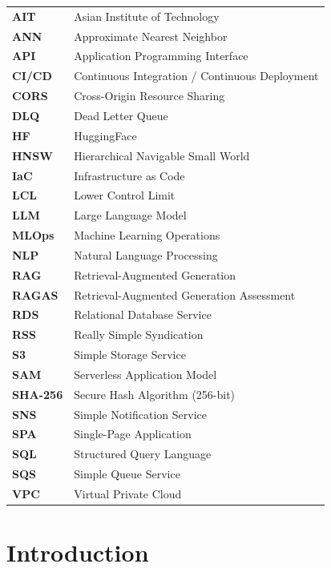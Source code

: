 \documentclass[12pt,a4paper]{report}
\begin{document}
\begin{tabular}{@{}p{3.2cm}p{10.0cm}@{}}
\textbf{AIT} & Asian Institute of Technology \\
\textbf{ANN} & Approximate Nearest Neighbor \\
\textbf{API} & Application Programming Interface \\
\textbf{CI/CD} & Continuous Integration / Continuous Deployment \\
\textbf{CORS} & Cross-Origin Resource Sharing \\
\textbf{DLQ} & Dead Letter Queue \\
\textbf{HF} & HuggingFace \\
\textbf{HNSW} & Hierarchical Navigable Small World \\
\textbf{IaC} & Infrastructure as Code \\
\textbf{LCL} & Lower Control Limit \\
\textbf{LLM} & Large Language Model \\
\textbf{MLOps} & Machine Learning Operations \\
\textbf{NLP} & Natural Language Processing \\
\textbf{RAG} & Retrieval-Augmented Generation \\
\textbf{RAGAS} & Retrieval-Augmented Generation Assessment \\
\textbf{RDS} & Relational Database Service \\
\textbf{RSS} & Really Simple Syndication \\
\textbf{S3} & Simple Storage Service \\
\textbf{SAM} & Serverless Application Model \\
\textbf{SHA-256} & Secure Hash Algorithm (256-bit) \\
\textbf{SNS} & Simple Notification Service \\
\textbf{SPA} & Single-Page Application \\
\textbf{SQL} & Structured Query Language \\
\textbf{SQS} & Simple Queue Service \\
\textbf{VPC} & Virtual Private Cloud \\
\end{tabular}

\newpage
{}

\chapter{Introduction}
\end{document}
